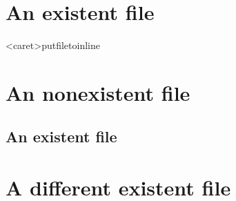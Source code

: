 \section{An existent file}
\in<caret>put{filetoinline}

\section{An nonexistent file}


\subsection{An existent file}


\section{A different existent file}


